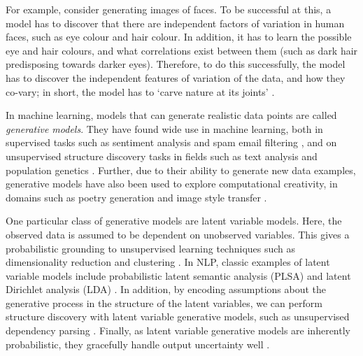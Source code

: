 For example, consider generating images of faces. To be successful at this, a model has to discover that there are independent factors of variation in human faces, such as eye colour and hair colour. In addition, it has to learn the possible eye and hair colours, and what correlations exist between them (such as dark hair predisposing towards darker eyes). Therefore, to do this successfully, the model has to discover the independent features of variation of the data, and how they co-vary; in short, the model has to `carve nature at its joints' \citep{Plato:52}.

In machine learning, models that can generate realistic data points are called \textit{generative models}. They have found wide use in machine learning, both in supervised tasks such as sentiment analysis \citep{Pang:02} and spam email filtering \citep{Pantel:98,Sahami:98}, and on unsupervised structure discovery tasks in fields such as text analysis \citep{Blei:03} and population genetics \citep{Pritchard:00}. Further, due to their ability to generate new data examples, generative models have also been used to explore computational creativity, in domains such as poetry generation \citep{Zhang:14,Ghazvininejad:16,Hopkins:17} and image style transfer \citep{Zhu:17}.

One particular class of generative models are latent variable models. Here, the observed data is assumed to be dependent on unobserved variables. This gives a probabilistic grounding to unsupervised learning techniques such as dimensionality reduction \citep{Tipping:99} and clustering \citep{Gorur:10}. In NLP, classic examples of latent variable models include probabilistic latent semantic analysis (PLSA) \citep{Hofmann:99} and latent Dirichlet analysis (LDA) \citep{Blei:03}. In addition, by encoding assumptions about the generative process in the structure of the latent variables, we can perform structure discovery with latent variable generative models, such as unsupervised dependency parsing \citep{Klein:04,Blunsom:10}. Finally, as latent variable generative models are inherently probabilistic, they gracefully handle output uncertainty well \citep{Kohl:18}.

